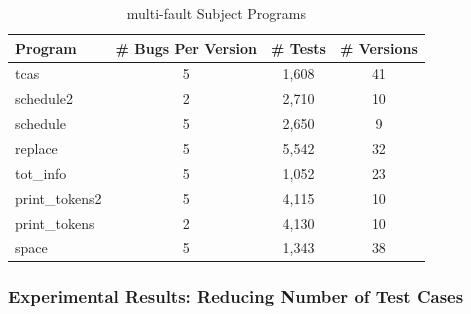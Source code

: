 \begin{table}[!htbp]
	\centering
	\caption{multi-fault Subject Programs}\label{tab:multibug}
	\renewcommand{\arraystretch}{1.5}
    \begin{tabular}{|l|c|c|c|} \hline
        Program & \# Bugs Per Version &\# Tests& \# Versions\\ \hline\hline
		tcas & 5 &1,608& 41\\ \hline
        schedule2 & 2& 2,710 & 10\\ \hline
        schedule & 5&2,650 & 9\\ \hline
        replace & 5&5,542 & 32\\ \hline
		tot\_info & 5 &1,052 & 23\\ \hline
        print\_tokens2 & 5 &4,115& 10\\ \hline
        print\_tokens & 2&4,130 & 10\\ \hline
        space & 5&1,343 & 38\\ \hline
	\end{tabular}
	\label{dataset}
\end{table}




\subsubsection{Experimental Results: Reducing Number of Test Cases}\label{sec.exp.resultsA2}


